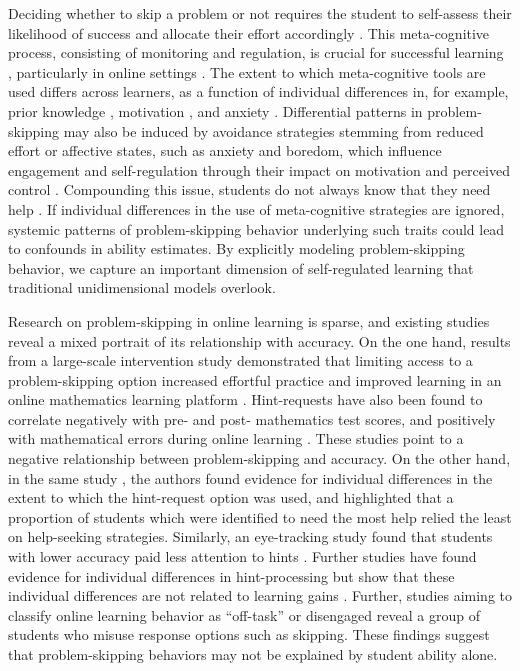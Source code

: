 \documentclass{edm_article}
\begin{document}
Deciding whether to skip a problem or not requires the student to self-assess their likelihood of success and allocate their effort accordingly \cite{winne2017cognition}. This meta-cognitive process, consisting of monitoring and regulation, is crucial for successful learning \cite{rabinowitz2017nteraction, fleur2021metacognition, colantonio2024predicting}, particularly in online settings \cite{zhao2020time, kim2009not, fidan2024emotions, shields2024active}. The extent to which meta-cognitive tools are used differs across learners, as a function of individual differences in, for example, prior knowledge \cite{taub2014can}, motivation \cite{sungur2007modeling, karlen2016differences}, and anxiety \cite{matthews1999metacognition, wells1995metacognition}. Differential patterns in problem-skipping may also be induced by avoidance strategies stemming from reduced effort or affective states, such as anxiety and boredom, which influence engagement and self-regulation through their impact on motivation and perceived control \cite{pekrun2013control}. Compounding this issue, students do not always know that they need help \cite{aleven2000limitations}. If individual differences in the use of meta-cognitive strategies are ignored, systemic patterns of problem-skipping behavior underlying such traits could lead to confounds in ability estimates. By explicitly modeling problem-skipping behavior, we capture an important dimension of self-regulated learning that traditional unidimensional models overlook. 

Research on problem-skipping in online learning is sparse, and existing studies reveal a mixed portrait of its relationship with accuracy. On the one hand, results from a large-scale intervention study demonstrated that limiting access to a problem-skipping option increased effortful practice and improved learning in an online mathematics learning platform \cite{savi2018delaying, savi2023combating}. Hint-requests have also been found to correlate negatively with pre- and post- mathematics test scores, and positively with mathematical errors during online learning \cite{norum2024student}. These studies point to a negative relationship between problem-skipping and accuracy. On the other hand, in the same study \cite{norum2024student}, the authors found evidence for individual differences in the extent to which the hint-request option was used, and highlighted that a proportion of students which were identified to need the most help relied the least on help-seeking strategies. Similarly, an eye-tracking study found that students with lower accuracy paid less attention to hints \cite{conati2013understanding}. Further studies have found evidence for individual differences in hint-processing but show that these individual differences are not related to learning gains \cite{goldin2012learner, goldin2013hints}. Further, studies aiming to classify online learning behavior as ``off-task'' or disengaged \cite{baker2004off, baker2004detecting, baker2005performance, beck2004using} reveal a group of students who misuse response options such as skipping. These findings suggest that problem-skipping behaviors may not be explained by student ability alone. 
\end{document}
